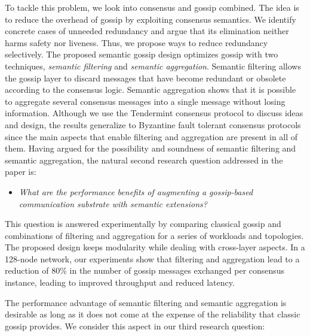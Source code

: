 To tackle this problem, we look into consensus and gossip combined.
The idea is to reduce the overhead of gossip by exploiting consensus semantics.  We identify concrete cases of unneeded redundancy and argue that its elimination neither harms safety nor liveness.  Thus, we propose ways to reduce redundancy selectively.
The proposed semantic gossip design optimizes gossip with two techniques, \emph{semantic filtering} and \emph{semantic aggregation}.
Semantic filtering allows the gossip layer to discard messages that have become redundant or obsolete according to the consensus logic.
Semantic aggregation shows that it is possible to aggregate several consensus messages into a single message without losing information. 
%
Although we use the Tendermint consensus protocol \cite{buchman2019latestgossipbftconsensus} to discuss ideas and design, the results generalize to Byzantine fault tolerant consensus protocols since the main aspects that enable filtering and aggregation are present in all of them. 
%
Having argued for the possibility and soundness of semantic filtering and semantic aggregation, the natural second research question addressed in the paper is:
\vspace{-2mm}
\begin{itemize}
\item[]  \emph{What are the performance benefits of augmenting a gossip-based communication substrate with semantic extensions?}
\end{itemize}
\vspace{-2mm}

This question is answered experimentally by comparing classical gossip and combinations of filtering and aggregation for a series of workloads and topologies. The proposed design keeps modularity while dealing with cross-layer aspects.
%
In a 128-node network, our experiments show that filtering and aggregation lead to a reduction of 80\% in the number of gossip messages exchanged per consensus instance, leading to improved throughput and reduced latency.


The performance advantage of semantic filtering and semantic aggregation is desirable as long as it does not come at the expense of the reliability that classic gossip provides.
We consider this aspect in our third research question: 


